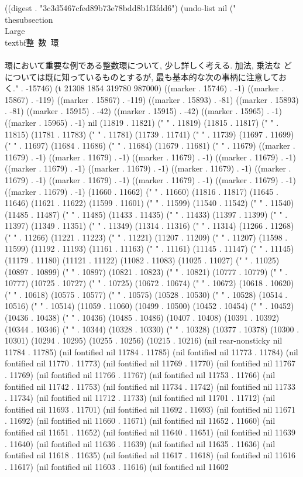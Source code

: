 
((digest . "3c3d5467cfed89b73e78bdd8b1f3fdd6") (undo-list nil ("
\\thesubsection{\\Large{\\textbf{整~数~環}}}\\\\
環において重要な例である整数環について, 少し詳しく考える. 加法, 乗法な
どについては既に知っているものとするが, 最も基本的な次の事柄に注意してお
く." . -15746) (t 21308 1854 319780 987000) ((marker . 15746) . -1) ((marker . 15867) . -119) ((marker . 15867) . -119) ((marker . 15893) . -81) ((marker . 15893) . -81) ((marker . 15915) . -42) ((marker . 15915) . -42) ((marker . 15965) . -1) ((marker . 15965) . -1) nil (11819 . 11821) (" " . 11819) (11815 . 11817) (" " . 11815) (11781 . 11783) (" " . 11781) (11739 . 11741) (" " . 11739) (11697 . 11699) (" " . 11697) (11684 . 11686) (" " . 11684) (11679 . 11681) (" " . 11679) ((marker . 11679) . -1) ((marker . 11679) . -1) ((marker . 11679) . -1) ((marker . 11679) . -1) ((marker . 11679) . -1) ((marker . 11679) . -1) ((marker . 11679) . -1) ((marker . 11679) . -1) ((marker . 11679) . -1) ((marker . 11679) . -1) ((marker . 11679) . -1) ((marker . 11679) . -1) (11660 . 11662) (" " . 11660) (11816 . 11817) (11645 . 11646) (11621 . 11622) (11599 . 11601) (" " . 11599) (11540 . 11542) (" " . 11540) (11485 . 11487) (" " . 11485) (11433 . 11435) (" " . 11433) (11397 . 11399) (" " . 11397) (11349 . 11351) (" " . 11349) (11314 . 11316) (" " . 11314) (11266 . 11268) (" " . 11266) (11221 . 11223) (" " . 11221) (11207 . 11209) (" " . 11207) (11598 . 11599) (11192 . 11193) (11161 . 11163) (" " . 11161) (11145 . 11147) (" " . 11145) (11179 . 11180) (11121 . 11122) (11082 . 11083) (11025 . 11027) (" " . 11025) (10897 . 10899) (" " . 10897) (10821 . 10823) (" " . 10821) (10777 . 10779) (" " . 10777) (10725 . 10727) (" " . 10725) (10672 . 10674) (" " . 10672) (10618 . 10620) (" " . 10618) (10575 . 10577) (" " . 10575) (10528 . 10530) (" " . 10528) (10514 . 10516) (" " . 10514) (11059 . 11060) (10499 . 10500) (10452 . 10454) (" " . 10452) (10436 . 10438) (" " . 10436) (10485 . 10486) (10407 . 10408) (10391 . 10392) (10344 . 10346) (" " . 10344) (10328 . 10330) (" " . 10328) (10377 . 10378) (10300 . 10301) (10294 . 10295) (10255 . 10256) (10215 . 10216) (nil rear-nonsticky nil 11784 . 11785) (nil fontified nil 11784 . 11785) (nil fontified nil 11773 . 11784) (nil fontified nil 11770 . 11773) (nil fontified nil 11769 . 11770) (nil fontified nil 11767 . 11769) (nil fontified nil 11766 . 11767) (nil fontified nil 11753 . 11766) (nil fontified nil 11742 . 11753) (nil fontified nil 11734 . 11742) (nil fontified nil 11733 . 11734) (nil fontified nil 11712 . 11733) (nil fontified nil 11701 . 11712) (nil fontified nil 11693 . 11701) (nil fontified nil 11692 . 11693) (nil fontified nil 11671 . 11692) (nil fontified nil 11660 . 11671) (nil fontified nil 11652 . 11660) (nil fontified nil 11651 . 11652) (nil fontified nil 11640 . 11651) (nil fontified nil 11639 . 11640) (nil fontified nil 11636 . 11639) (nil fontified nil 11635 . 11636) (nil fontified nil 11618 . 11635) (nil fontified nil 11617 . 11618) (nil fontified nil 11616 . 11617) (nil fontified nil 11603 . 11616) (nil fontified nil 11602 